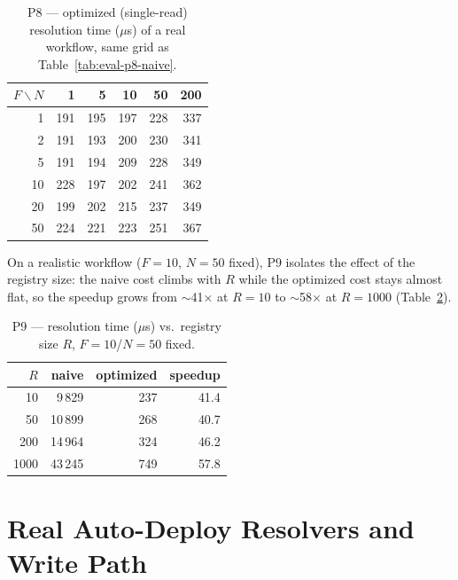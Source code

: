 \begin{table}[htbp]
  \centering
  \caption{P8 --- optimized (single-read) resolution time ($\mu$s) of a real workflow, same grid
  as Table~\ref{tab:eval-p8-naive}.}
  \label{tab:eval-p8-optimized}
  \begin{tabular}{rrrrrr}
    \hline
    $F\backslash N$ & 1 & 5 & 10 & 50 & 200 \\
    \hline
    1  & 191 & 195 & 197 & 228 & 337 \\
    2  & 191 & 193 & 200 & 230 & 341 \\
    5  & 191 & 194 & 209 & 228 & 349 \\
    10 & 228 & 197 & 202 & 241 & 362 \\
    20 & 199 & 202 & 215 & 237 & 349 \\
    50 & 224 & 221 & 223 & 251 & 367 \\
    \hline
  \end{tabular}
\end{table}

On a realistic workflow ($F{=}10$, $N{=}50$ fixed), P9 isolates the effect of the registry size:
the naive cost climbs with $R$ while the optimized cost stays almost flat, so the speedup grows
from $\sim$41$\times$ at $R{=}10$ to $\sim$58$\times$ at $R{=}1000$ (Table~\ref{tab:eval-p9}).

\begin{table}[htbp]
  \centering
  \caption{P9 --- resolution time ($\mu$s) vs.\ registry size $R$, $F{=}10$/$N{=}50$ fixed.}
  \label{tab:eval-p9}
  \begin{tabular}{rrrr}
    \hline
    \textbf{$R$} & \textbf{naive} & \textbf{optimized} & \textbf{speedup} \\
    \hline
    10   & 9\,829  & 237 & 41.4 \\
    50   & 10\,899 & 268 & 40.7 \\
    200  & 14\,964 & 324 & 46.2 \\
    1000 & 43\,245 & 749 & 57.8 \\
    \hline
  \end{tabular}
\end{table}

\section{Real Auto-Deploy Resolvers and Write Path}
\label{sec:eval-real-resolvers}

